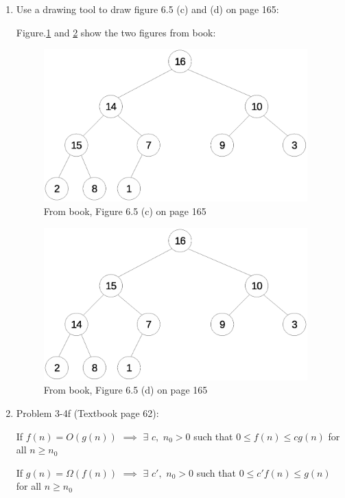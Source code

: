 \documentclass[11pt]{article}
\begin{document}
\begin{enumerate}

\itemsep 0.35in


\item Use a drawing tool to draw figure 6.5 (c) and (d) on page 165: 

	Figure.\ref{fig:prob1-c} and \ref{fig:prob1-d} show the two figures from book:

	
	\begin{figure}[h!]
		\centerline{\includegraphics[width=4in]{prob1-c.eps}}
		\caption{From book, Figure 6.5 (c) on page 165}
		\label{fig:prob1-c}
	\end{figure}
	
	\begin{figure}[h!]
		\centerline{\includegraphics[width=4in]{prob1-d.eps}}
		\caption{From book, Figure 6.5 (d) on page 165}
		\label{fig:prob1-d}
	\end{figure}





\item Problem 3-4f (Textbook page 62):

	If $ f(n)= O(g(n)) $ $\implies$ $ \exists $ $ c, $ $ n_0>0 $ such that $ 0 \leq f(n) \leq cg(n) $ for all $ n \geq n_0 $  
	
	If $ g(n)= \Omega(f(n)) $ $\implies$ $ \exists $ $ c{'}, $ $ n_0>0 $ such that $ 0 \leq c{'}f(n) \leq g(n) $ for all $ n \geq n_0 $     
	

\end{enumerate}
\end{document}
